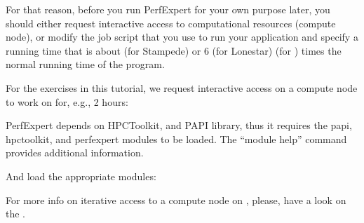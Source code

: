 For that reason, before you run PerfExpert for your own purpose later, you should either request interactive access to computational resources (compute node), or modify the job script that you use to run your application and specify a running time that is about
 (for Stampede) or 6 (for Lonestar)
 (for \hpcname)
\fi
 times the normal running time of the program.

For the exercises in this tutorial, we request interactive access on a compute node to work on for, e.g., 2 hours:

\iftacc
\begin{prompt}
\end{prompt}
\fi
\ifvsc
\begin{prompt}
\end{prompt}
\fi

PerfExpert depends on HPCToolkit, and PAPI library, thus it requires the papi, hpctoolkit, and perfexpert modules to be loaded. The ``module help'' command provides additional information.

And load the appropriate modules:
\iftacc
\begin{prompt}
\end{prompt}
\fi
\ifvsc
\begin{prompt}
\end{prompt}
\fi
\ifbrussel
\begin{prompt}
\end{prompt}
\fi

For more info on iterative access to a compute node on \hpcname, please, have a look on the \hpcuserguide.
